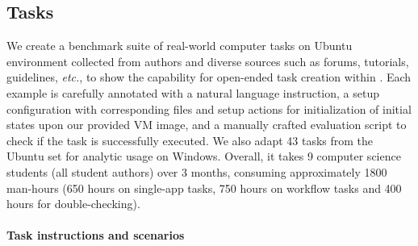 \subsection{Tasks}
\vspace{-5pt}
We create a benchmark suite of \numexamples real-world computer tasks on Ubuntu environment collected from authors and diverse sources such as forums, tutorials, guidelines, \textit{etc.}, to show the capability for open-ended task creation within \ours.
Each example is carefully annotated with a natural language instruction, 
a setup configuration with corresponding files and setup actions for initialization of initial states upon our provided VM image, 
and a manually crafted evaluation script to check if the task is successfully executed.
We also adapt 43 tasks from the Ubuntu set for analytic usage on Windows.
Overall, it takes 9 computer science students (all student authors) over 3 months, consuming approximately 1800 man-hours (650 hours on single-app tasks, 750 hours on workflow tasks and 400 hours for double-checking).

\paragraph{Task instructions and scenarios}

